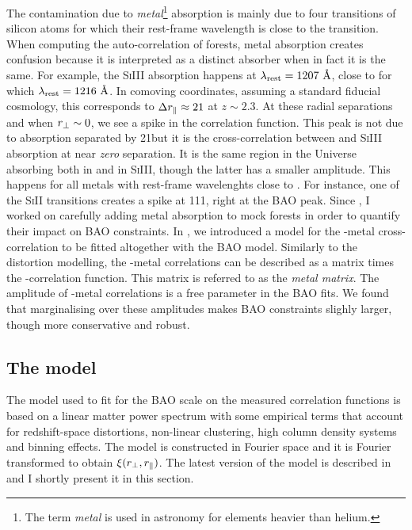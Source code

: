 The contamination due to \emph{metal}\footnote{The term \emph{metal} is used in 
astronomy for elements heavier than helium.} 
absorption is mainly due to four transitions of silicon atoms for which their 
rest-frame wavelength is close to the \lya transition. When computing the 
auto-correlation of forests, metal absorption creates confusion because 
it is interpreted as a distinct \lya absorber when in fact it is the same. 
For example, the \textsc{SiIII} absorption happens at 
$\lambda_\mathrm{rest} = 1207~\angstrom$, close to \lya for which $\lambda_\mathrm{rest} = 1216~\angstrom$. 
In comoving coordinates, assuming a standard fiducial cosmology, this corresponds
to $\Delta {r_\parallel} \approx 21$\hmpc 
at $z \sim 2.3$. At these radial separations and when ${r_\perp} \sim 0$, we see a 
spike in the correlation function. This peak is not due to \lya absorption 
separated by 21\hmpc but it is the cross-correlation between \lya and \textsc{SiIII}
absorption at near \emph{zero} separation. It is the same region in the 
Universe absorbing both in \lya and in \textsc{SiIII}, though the latter 
has a smaller amplitude. This happens for all metals with rest-frame 
wavelenghts close to \lya. For instance, one of the \textsc{SiII} transitions 
creates a spike at 111\hmpc, right at the BAO peak. 
Since \cite{delubacBaryonAcousticOscillations2015}, I worked on carefully 
adding metal absorption to mock forests in order to quantify their impact on 
BAO constraints. In \cite{bautistaMeasurementBaryonAcoustic2017}, we introduced 
a model for the \lya-metal cross-correlation to be fitted altogether with the 
BAO model. Similarly to the distortion modelling, the \lya-metal correlations 
can be described as a matrix times the \lya-\lya correlation function. 
This matrix is referred to as the \emph{metal matrix}. The amplitude of 
\lya-metal correlations is a free parameter in the BAO fits. 
We found that marginalising over these amplitudes makes BAO constraints 
slighly larger, though more conservative and robust.   

\subsection{The model}
\label{forests:bao:model}

The model used to fit for the BAO scale on the measured correlation functions 
is based on a linear matter power spectrum with some empirical terms 
that account for redshift-space distortions, non-linear clustering, 
high column density systems and binning effects. The model is constructed in 
Fourier space and it is Fourier transformed to obtain $\xi({r_\perp}, {r_\parallel})$. 
The latest version of the model is described in \cite{dumasdesbourbouxhelionCompletedSDSSIVExtended2020}
and I shortly present it in this section. 

